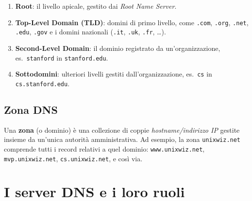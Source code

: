 \documentclass{article}
\begin{document}
\begin{enumerate}[label=\textbf{\arabic*.}]
    \item \textbf{Root}: il livello apicale, gestito dai \emph{Root Name Server}.
    \item \textbf{Top-Level Domain (TLD)}: domini di primo livello, come
          \texttt{.com}, \texttt{.org}, \texttt{.net}, \texttt{.edu},
          \texttt{.gov} e i domini nazionali (\texttt{.it}, \texttt{.uk},
          \texttt{.fr}, \ldots).
    \item \textbf{Second-Level Domain}: il dominio registrato da
          un'organizzazione, es.\ \texttt{stanford} in \texttt{stanford.edu}.
    \item \textbf{Sottodomini}: ulteriori livelli gestiti dall'organizzazione,
          es.\ \texttt{cs} in \texttt{cs.stanford.edu}.
\end{enumerate}


\begin{figure}[H]
\centering
{}
\end{figure}

\subsection*{Zona DNS}

Una \textbf{zona} (o dominio) è una collezione di coppie
\emph{hostname/indirizzo IP} gestite insieme da un'unica autorità
amministrativa. Ad esempio, la zona \texttt{unixwiz.net} comprende tutti
i record relativi a quel dominio: \texttt{www.unixwiz.net},
\texttt{mvp.unixwiz.net}, \texttt{cs.unixwiz.net}, e così via.


\section*{I server DNS e i loro ruoli}
\end{document}
